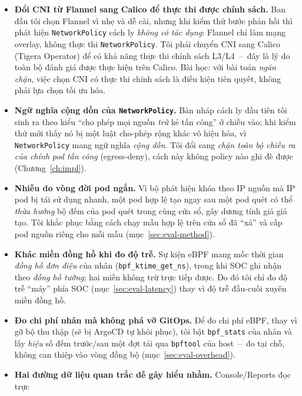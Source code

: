 \begin{itemize}[leftmargin=1.4em]
  \item \textbf{Đổi CNI từ Flannel sang Calico để thực thi được chính sách.} Ban đầu
        tôi chọn Flannel vì nhẹ và dễ cài, nhưng khi kiểm thử bước phản hồi thì phát
        hiện \texttt{NetworkPolicy} cách ly \emph{không có tác dụng}: Flannel chỉ làm
        mạng overlay, không thực thi \texttt{NetworkPolicy}. Tôi phải chuyển CNI sang
        Calico (Tigera Operator) để có khả năng thực thi chính sách L3/L4~--~đây là lý
        do toàn bộ đánh giá được thực hiện trên Calico. Bài học: với bài toán
        \emph{ngăn chặn}, việc chọn CNI có thực thi chính sách là điều kiện tiên quyết,
        không phải lựa chọn tối ưu hóa.
  \item \textbf{Ngữ nghĩa cộng dồn của \texttt{NetworkPolicy}.} Bản nháp cách ly đầu
        tiên tôi sinh ra theo kiểu ``cho phép mọi nguồn \emph{trừ} kẻ tấn công'' ở
        chiều vào; khi kiểm thử mới thấy nó bị một luật cho-phép rộng khác vô hiệu hóa,
        vì \texttt{NetworkPolicy} mang ngữ nghĩa \emph{cộng dồn}. Tôi đổi sang
        \emph{chặn toàn bộ chiều ra của chính pod tấn công} (egress-deny), cách này
        không policy nào ghi đè được (Chương~\ref{ch:impl}).
  \item \textbf{Nhiễu do vòng đời pod ngắn.} Vì bộ phát hiện khóa theo IP nguồn mà IP
        pod bị tái sử dụng nhanh, một pod hợp lệ tạo ngay sau một pod quét có thể
        \emph{thừa hưởng} bộ đếm của pod quét trong cùng cửa sổ, gây dương tính giả giả
        tạo. Tôi khắc phục bằng cách chạy mẫu hợp lệ trên cửa sổ đã ``xả'' và cấp pod
        nguồn riêng cho mỗi mẫu (mục~\ref{sec:eval-method}).
  \item \textbf{Khác miền đồng hồ khi đo độ trễ.} Sự kiện eBPF mang mốc thời gian
        \emph{đồng hồ đơn điệu} của nhân (\texttt{bpf\_ktime\_get\_ns}), trong khi SOC
        ghi nhận theo \emph{đồng hồ tường}; hai miền không trừ trực tiếp được. Do đó
        tôi chỉ đo độ trễ ``máy'' phía SOC (mục~\ref{sec:eval-latency}) thay vì độ trễ
        đầu-cuối xuyên miền đồng hồ.
  \item \textbf{Đo chi phí nhân mà không phá vỡ GitOps.} Để đo chi phí eBPF, thay vì gỡ
        bộ thu thập (sẽ bị ArgoCD tự khôi phục), tôi bật \texttt{bpf\_stats} của nhân và
        lấy \emph{hiệu} số đếm trước/sau một đợt tải qua \texttt{bpftool} của host~--~đo
        tại chỗ, không can thiệp vào vòng đồng bộ (mục~\ref{sec:eval-overhead}).
  \item \textbf{Hai đường dữ liệu quan trắc dễ gây hiểu nhầm.} Console/Reports đọc trực

\end{itemize}
